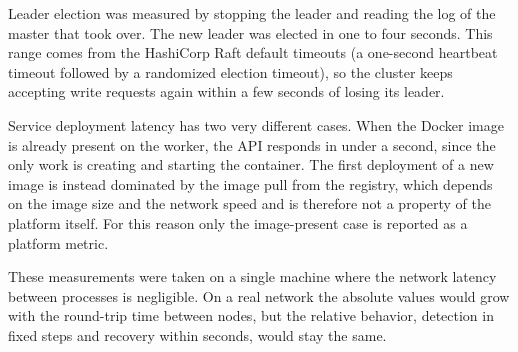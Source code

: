 Leader election was measured by stopping the leader and reading the log of the master that took over. The new leader was elected in one to four seconds. This range comes from the HashiCorp Raft default timeouts (a one-second heartbeat timeout followed by a randomized election timeout), so the cluster keeps accepting write requests again within a few seconds of losing its leader.

Service deployment latency has two very different cases. When the Docker image is already present on the worker, the API responds in under a second, since the only work is creating and starting the container. The first deployment of a new image is instead dominated by the image pull from the registry, which depends on the image size and the network speed and is therefore not a property of the platform itself. For this reason only the image-present case is reported as a platform metric.

These measurements were taken on a single machine where the network latency between processes is negligible. On a real network the absolute values would grow with the round-trip time between nodes, but the relative behavior, detection in fixed steps and recovery within seconds, would stay the same.